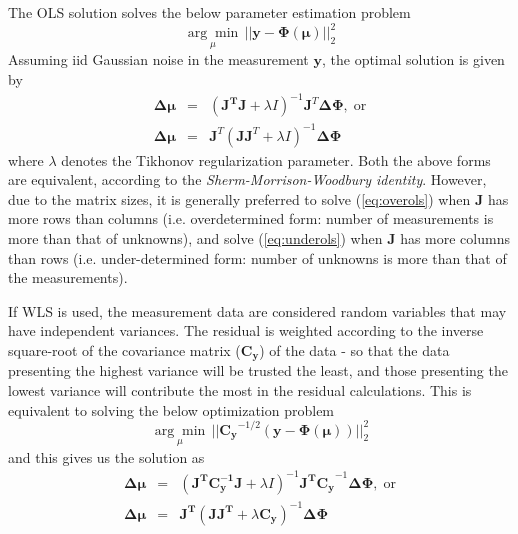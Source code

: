 \documentclass[12pt]{book}               %
\begin{document}
The OLS solution solves the below parameter estimation problem
\begin{equation}
\underset{\mu}{\arg\min} \, || \mathbf{y-\Phi(\mu)} ||^2_2
\end{equation}
Assuming iid Gaussian noise in the measurement $\mathbf y$, the optimal solution is given by
\begin{eqnarray}
\mathbf{\Delta\mu}&=&(\mathbf{J^TJ}+\lambda I)^{-1}\mathbf{J}^T\mathbf{\Delta\Phi},\;\mathrm{or}\label{eq:overols}\\
\mathbf{\Delta\mu}&=&\mathbf{J}^T(\mathbf{JJ}^T+\lambda I)^{-1}\mathbf{\Delta\Phi}\label{eq:underols}
\end{eqnarray}
where $\lambda$ denotes the Tikhonov regularization parameter. Both the above forms are equivalent, according to the \emph{Sherm-Morrison-Woodbury
identity}. However, due to the matrix sizes, it is generally preferred to solve (\ref{eq:overols}) when $\mathbf{J}$ has more rows than columns (i.e. overdetermined form: number of measurements is more than that of unknowns), and solve (\ref{eq:underols}) when $\mathbf{J}$ has more columns than rows (i.e. under-determined form: number of unknowns is more than that of the measurements).

If WLS is used, the measurement data are considered random variables that may have independent variances. The residual is weighted according to the inverse square-root of the covariance matrix ($\mathbf{C_y}$) of the data - so that the data presenting the highest variance will be trusted the least, and those presenting the lowest variance will contribute the most in the residual calculations. This is equivalent to solving the below optimization problem
\begin{equation}
\underset{\mu}{\arg\min} \, || \mathbf{C_y}^{-1/2}\left(\boldsymbol{y-\Phi(\mu)}\right) ||^2_2
\end{equation}
and this gives us the solution as
\begin{eqnarray}
\mathbf{\Delta\mu}&=&(\mathbf{J^TC_y^{-1}J}+\lambda I)^{-1}\mathbf{J^TC_y}^{-1}\mathbf{\Delta\Phi},\;\mathrm{or}\label{eq:overwls}\\
\mathbf{\Delta\mu}&=&\mathbf{J^T}(\mathbf{JJ^T}+\lambda \mathbf{C_y})^{-1}\mathbf{\Delta\Phi}\label{eq:underwls}
\end{eqnarray}
\end{document}
